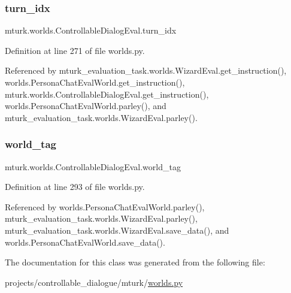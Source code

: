 \subsubsection{\texorpdfstring{turn\+\_\+idx}{turn\_idx}}
{\footnotesize\ttfamily mturk.\+worlds.\+Controllable\+Dialog\+Eval.\+turn\+\_\+idx}



Definition at line 271 of file worlds.\+py.



Referenced by mturk\+\_\+evaluation\+\_\+task.\+worlds.\+Wizard\+Eval.\+get\+\_\+instruction(), worlds.\+Persona\+Chat\+Eval\+World.\+get\+\_\+instruction(), mturk.\+worlds.\+Controllable\+Dialog\+Eval.\+get\+\_\+instruction(), worlds.\+Persona\+Chat\+Eval\+World.\+parley(), and mturk\+\_\+evaluation\+\_\+task.\+worlds.\+Wizard\+Eval.\+parley().

\mbox{\label{classmturk_1_1worlds_1_1ControllableDialogEval_a05c72f3704bab687338db610729a0611}} 
\subsubsection{\texorpdfstring{world\+\_\+tag}{world\_tag}}
{\footnotesize\ttfamily mturk.\+worlds.\+Controllable\+Dialog\+Eval.\+world\+\_\+tag}



Definition at line 293 of file worlds.\+py.



Referenced by worlds.\+Persona\+Chat\+Eval\+World.\+parley(), mturk\+\_\+evaluation\+\_\+task.\+worlds.\+Wizard\+Eval.\+parley(), mturk\+\_\+evaluation\+\_\+task.\+worlds.\+Wizard\+Eval.\+save\+\_\+data(), and worlds.\+Persona\+Chat\+Eval\+World.\+save\+\_\+data().



The documentation for this class was generated from the following file\+:\begin{DoxyCompactItemize}
\item 
projects/controllable\+\_\+dialogue/mturk/\hyperlink{projects_2controllable__dialogue_2mturk_2worlds_8py}{worlds.\+py}\end{DoxyCompactItemize}
